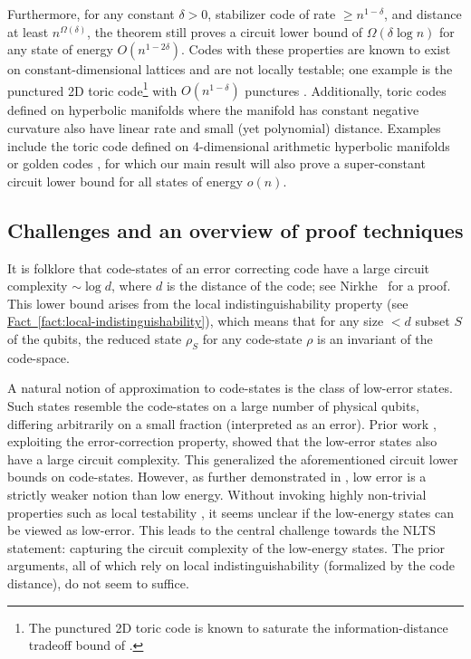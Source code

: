 \documentclass[11pt]{article}
\newcommand{\expref}[2]{\texorpdfstring{\hyperref[#2]{#1~\ref{#2}}}{#1~\ref{#2}}}
\begin{document}
%
%
%
%
%
%
%
%
%
%
Furthermore, for any constant $\delta > 0$,
stabilizer code of rate $\ge n^{1-\delta}$,  %
and distance at least $n^{\Omega(\delta)}$, the theorem still proves a circuit lower bound of $\Omega(\delta \log n)$ for any state of energy $O(n^{1-2\delta})$. Codes with these properties are known to exist on constant-dimensional lattices and are not
%
locally testable;    %
one example is the punctured 2D toric code\footnote{The punctured 2D toric code is known to saturate the information-distance tradeoff bound of \cite{PhysRevLett.104.050503}.} with $O(n^{1-\delta})$ punctures \cite{PhysRevLett.104.050503,PhysRevA.86.032324}. Additionally, toric codes defined on hyperbolic manifolds where the manifold has constant negative curvature also have linear rate and small (yet polynomial) distance. Examples include the toric code defined on  4-dimensional arithmetic hyperbolic manifolds \cite{doi:10.1063/1.4891487} or golden codes \cite{10.5555/3370251.3370252}, for which our main result will also prove a super-constant circuit lower bound for all states of energy $o(n)$. 

\subsection{Challenges and an overview of proof techniques}


%
%
It is folklore that code-states of an error correcting code have a large circuit complexity $\sim\log d$, where $d$ is the distance of the code; see Nirkhe~\cite{Nirkhe:EECS-2022-236} for a proof. This lower bound arises from the local indistinguishability property (see \expref{Fact}{fact:local-indistinguishability}), which means that for any size $< d$ subset $S$ of the qubits, the
%
reduced state $\rho_S$ %
for any code-state $\rho$ is an invariant of the code-space.

A natural notion of approximation to code-states is the class of low-error states. Such states resemble the code-states on a large number of physical qubits, differing arbitrarily on a small fraction (interpreted as an error). Prior %
%
work  %
\cite{8104078, nirkhe_et_al:LIPIcs:2018:9095}, exploiting the error-correction property, showed that the low-error states also have a large circuit complexity. This generalized the aforementioned circuit lower bounds on code-states. However, as further demonstrated in \cite{nirkhe_et_al:LIPIcs:2018:9095},
%
low error  %
is a strictly weaker notion than
%
low energy.  %
Without invoking highly non-trivial properties such as local testability \cite{8104078}, it seems unclear if the low-energy states can be viewed as low-error.  %
%
This leads to the central challenge towards the NLTS statement:
capturing  %
%
%
the circuit complexity of the low-energy states.
The prior arguments, all of which rely on local indistinguishability
%
%
(formalized by the code distance),  %
%
do not seem to suffice.  
\end{document}

